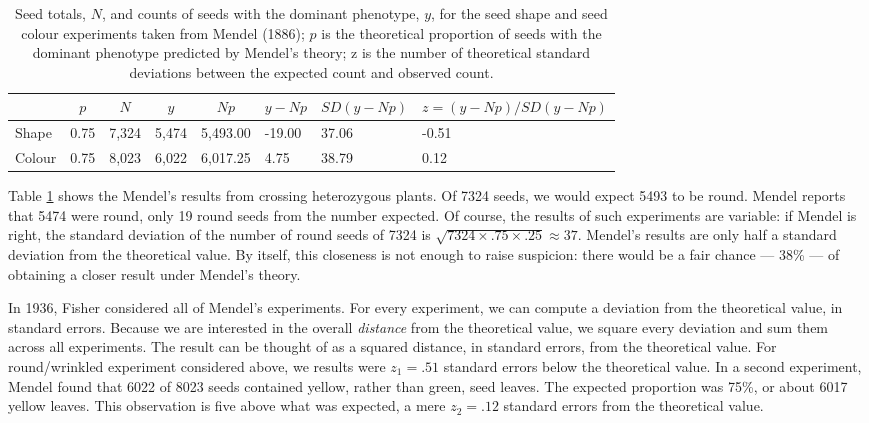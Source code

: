\documentclass[english,floatsintext,man]{apa6}
\theoremstyle{definition}
\theoremstyle{definition}
\theoremstyle{definition}
\theoremstyle{remark}
\begin{document}
\begin{table}[tbp]
\begin{center}
\begin{threeparttable}
\caption{\label{tab:mendel1}Seed totals, $N$, and counts of seeds with the dominant phenotype, $y$, for the seed shape and seed colour experiments taken from Mendel (1886); $p$ is the theoretical proportion of seeds with the dominant phenotype predicted by Mendel's theory; z is the number of theoretical standard deviations between the expected count and observed count.}
\begin{tabular}{llllllll}
\toprule
 & \multicolumn{1}{c}{$p$} & \multicolumn{1}{c}{$N$} & \multicolumn{1}{c}{$y$} & \multicolumn{1}{c}{$Np$} & \multicolumn{1}{c}{$y - Np$} & \multicolumn{1}{c}{$SD(y - Np)$} & \multicolumn{1}{c}{$z=(y-Np)/SD(y - Np)$}\\
\midrule
Shape & 0.75 & 7,324 & 5,474 & 5,493.00 & -19.00 & 37.06 & -0.51\\
Colour & 0.75 & 8,023 & 6,022 & 6,017.25 & 4.75 & 38.79 & 0.12\\
\bottomrule
\end{tabular}
\end{threeparttable}
\end{center}
\end{table}

Table \ref{tab:mendel1} shows the Mendel's results from crossing
heterozygous plants. Of 7324 seeds, we would expect 5493 to be round.
Mendel reports that 5474 were round, only 19 round seeds from the number
expected. Of course, the results of such experiments are variable: if
Mendel is right, the standard deviation of the number of round seeds of
7324 is \(\sqrt{7324 \times .75 \times .25} \approx 37\). Mendel's
results are only half a standard deviation from the theoretical value.
By itself, this closeness is not enough to raise suspicion: there would
be a fair chance --- 38\% --- of obtaining a closer result under
Mendel's theory.

In 1936, Fisher considered all of Mendel's experiments. For every
experiment, we can compute a deviation from the theoretical value, in
standard errors. Because we are interested in the overall
\emph{distance} from the theoretical value, we square every deviation
and sum them across all experiments. The result can be thought of as a
squared distance, in standard errors, from the theoretical value. For
round/wrinkled experiment considered above, we results were \(z_1=.51\)
standard errors below the theoretical value. In a second experiment,
Mendel found that 6022 of 8023 seeds contained yellow, rather than
green, seed leaves. The expected proportion was 75\%, or about 6017
yellow leaves. This observation is five above what was expected, a mere
\(z_2=.12\) standard errors from the theoretical value.
\end{document}
